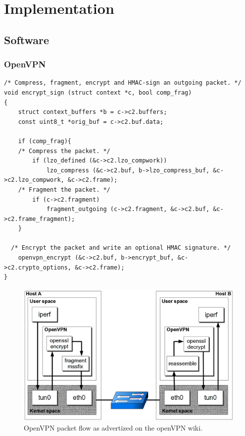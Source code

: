 \chapter{Implementation}

\section{Software}

\subsection{OpenVPN}

\lstset{language=c}
\begin{lstlisting}[caption=openvpn compress then encrypt -- sample from \texttt{forward.c}, label=list:]
/* Compress, fragment, encrypt and HMAC-sign an outgoing packet. */
void encrypt_sign (struct context *c, bool comp_frag)
{
	struct context_buffers *b = c->c2.buffers;
	const uint8_t *orig_buf = c->c2.buf.data;

	if (comp_frag){
	/* Compress the packet. */
		if (lzo_defined (&c->c2.lzo_compwork))
			lzo_compress (&c->c2.buf, b->lzo_compress_buf, &c->c2.lzo_compwork, &c->c2.frame);
	/* Fragment the packet. */
		if (c->c2.fragment)
			fragment_outgoing (c->c2.fragment, &c->c2.buf, &c->c2.frame_fragment);
	}

  /* Encrypt the packet and write an optional HMAC signature. */
	openvpn_encrypt (&c->c2.buf, b->encrypt_buf, &c->c2.crypto_options, &c->c2.frame);
}
\end{lstlisting}

\begin{figure}[ht]
\includegraphics[width=\textwidth]{OpenVPN-packetflow}
\caption{OpenVPN packet flow as advertized on the openVPN wiki.}
\label{fig:openvpn-packet-flow}
\end{figure}

